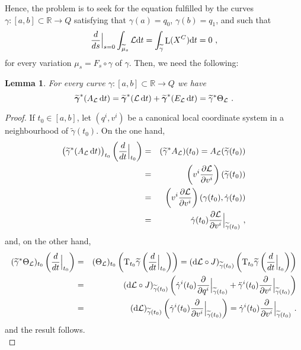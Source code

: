 \documentclass[12pt]{report}
\newtheorem{lem}[teor]{Lemma}
\def\derpar#1#2{\frac{\partial{#1}}{\partial{#2}}}
\def\qed{\ifvmode\removelastskip\fi
{\unskip\nobreak\hfil\penalty50\hbox{}\nobreak\hfil
\hbox{\vrule height1.2ex width1.2ex}\parfillskip=0pt
\finalhyphendemerits=0 \par\smallskip}}
\def\Lag{{\cal L}}
\def\d{{\rm d}}
\def\Real{\mathbb{R}}
\def\Tan{{\rm T}}
\def\Lie{\mathop{\rm L}\nolimits}
\begin{document}
Hence, the problem is to seek for the equation fulfilled by the curves 
$\gamma \colon [a,b]\subset\Real \to Q$
satisfying that $\gamma (a)=q_0$, $\gamma (b)=q_1$,
and such that
$$
\frac{d}{d s}\Big\vert_{s=0}\int_{\widetilde  \mu_s}\Lag \d t=
\int_{\widetilde  \gamma}\Lie (X^C)\d t = 0 \ ,
$$
for every variation $\mu_s=F_s\circ\gamma$ of $\gamma$.
Then, we need the following:

\begin{lem}
For every curve $\gamma \colon [a,b]\subset\Real \to Q$ we have
$$
\widetilde{\mbox{\boldmath$\gamma$}}^*(A_\Lag\,\d t)= 
\widetilde{\mbox{\boldmath$\gamma$}}^*(\Lag\,\d t) + \widetilde{\mbox{\boldmath$\gamma$}}^*(E_\Lag\,\d t)=
\widetilde{\gamma}^*\Theta_\Lag
\ .
$$
\end{lem}
\begin{proof}
If $t_0\in [a,b]$, let $(q^i,v^i)$ be
a canonical local coordinate system in a neighbourhood of
$\widetilde{\gamma} (t_0)$. 
On the one hand,
\begin{eqnarray*}
 \big(\widetilde{\gamma}^*(A_\Lag\,\d t)\big)_{t_0}\left(\frac{d}{d t}\Big\vert_{t_0}\right)
 &=&(\widetilde{\gamma}^*A_\Lag)(t_0)
=A_\Lag(\widetilde  \gamma (t_0))
\\ &=&
\left(v^i\derpar{\Lag}{v^i}\right)(\widetilde  \gamma (t_0))\\
& =&\left(v^i\derpar{\Lag}{v^i}\right)(\gamma (t_0),\dot\gamma (t_0))\\
&=&\dot\gamma (t_0)\derpar{\Lag}{v^i}\Big\vert_{\widetilde  \gamma (t_0)} \ ,
\end{eqnarray*}
and, on the other hand,
\begin{eqnarray*}
(\widetilde{\gamma}^*\Theta_\Lag)_{t_0}\left(\frac{d}{d t}\Big\vert_{t_0}\right)
&=&
(\Theta_\Lag)_{t_0}\left(\Tan_{t_0}\widetilde\gamma\left(\frac{d}{d t}\Big\vert_{t_0}\right)\right)=
(\d\Lag\circ J)_{\widetilde\gamma (t_0)}
\left(\Tan_{t_0}\widetilde{\gamma}\left(\frac{d}{d t}\Big\vert_{t_0}\right)\right)
\\ &=&
(\d\Lag\circ J)_{\widetilde\gamma (t_0)}
\left(\dot\gamma^i(t_0)\derpar{}{q^i}\Big\vert_{\widetilde  \gamma (t_0)}
+\ddot\gamma^i(t_0)\derpar{}{v^i}\Big\vert_{\widetilde  \gamma (t_0)}\right)
\\ &=&
(\d\Lag)_{\widetilde\gamma (t_0)}
\left(\dot\gamma^i(t_0)\derpar{}{v^i}\Big\vert_{\widetilde\gamma (t_0)}\right)
=\dot\gamma^i(t_0)\derpar{}{v^i}\Big\vert_{\widetilde\gamma (t_0)} \ .
\end{eqnarray*}
and the result follows.
\\ \qed \end{proof}
\end{document}
